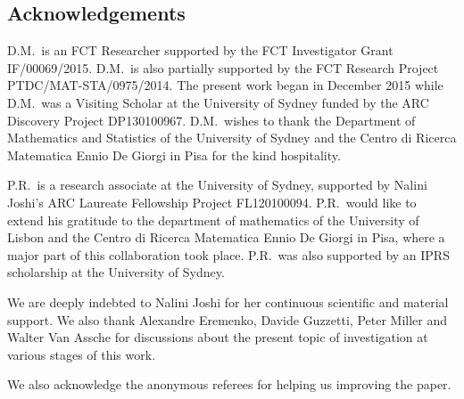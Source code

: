 \documentclass[pdftex]{sigma}
\numberwithin{equation}{section}
\begin{document}
\subsection*{Acknowledgements}
D.M.~is an FCT Researcher supported by the FCT Investigator Grant IF/00069/2015.
D.M.~is also partially supported by the FCT Research Project PTDC/MAT-STA/0975/2014.
The present work began in December 2015 while D.M.~was a Visiting Scholar at the University
of Sydney funded by the ARC Discovery Project DP130100967.
D.M.~wishes to thank the Department of Mathematics and Statistics of the University of
Sydney and the Centro di Ricerca Matematica Ennio De Giorgi in Pisa for the kind
hospitality.

P.R.~is a research associate at the University of Sydney, supported by Nalini Joshi's ARC Laureate Fellowship Project FL120100094.
P.R.~would like to extend his gratitude to the department of mathematics of the University of Lisbon
and the Centro di Ricerca Matematica Ennio De Giorgi in Pisa, where a major part of this collaboration took place.
P.R.~was also supported by an IPRS scholarship at the University of
Sydney.

We are deeply indebted to Nalini Joshi for her continuous scientif\/ic and material support. We also thank Alexandre Eremenko, Davide Guzzetti, Peter Miller and Walter Van Assche for discussions about the present topic of investigation at various stages of this work.

We also acknowledge the anonymous referees for helping us improving the paper.
\end{document}
